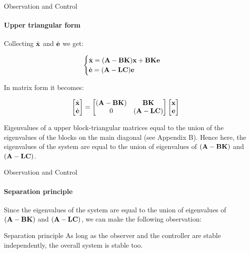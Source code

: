 \documentclass{beamer}
\begin{document}
\begin{frame}{Observation and Control}
\framesubtitle{Upper triangular form}
\begin{flushleft}

Collecting $\dot {\mathbf{x}}$ and $\dot{\mathbf{e}}$ we get:

\begin{equation}
\begin{cases}
\dot {\mathbf{x}} = (\mathbf{A}-\mathbf{B}\mathbf{K}) \mathbf{x} +  \mathbf{B}\mathbf{K}\mathbf{e} \\
\dot{\mathbf{e}} = 
(\mathbf{A}  - \mathbf{L}\mathbf{C})\mathbf{e}
\end{cases}
\end{equation}

In matrix form it becomes:

\begin{equation}
\begin{bmatrix}
\dot {\mathbf{x}} \\
\dot{\mathbf{e}}
\end{bmatrix}
=
\begin{bmatrix}
(\mathbf{A}-\mathbf{B}\mathbf{K}) & \mathbf{B}\mathbf{K} \\
0 & (\mathbf{A}  - \mathbf{L}\mathbf{C})
\end{bmatrix}
\begin{bmatrix}
\mathbf{x} \\
\mathbf{e}
\end{bmatrix}
\end{equation}

Eigenvalues of a upper block-triangular matrices equal to the union of the eigenvalues of the blocks on the main diagonal (see Appendix B). Hence here, the eigenvalues of the system are equal to the union of eigenvalues of $(\mathbf{A}-\mathbf{B}\mathbf{K})$ and $(\mathbf{A}  - \mathbf{L}\mathbf{C})$. 

\end{flushleft}
\end{frame}



\begin{frame}{Observation and Control}
\framesubtitle{Separation principle}
\begin{flushleft}
 
Since the eigenvalues of the system are equal to the union of eigenvalues of $(\mathbf{A}-\mathbf{B}\mathbf{K})$ and $(\mathbf{A}  - \mathbf{L}\mathbf{C})$, we can make the following observation:

\bigskip

\begin{alertblock}{Separation principle}
As long as the observer and the controller are stable independently, the overall system is stable too.
\end{alertblock}

\end{flushleft}
\end{frame}
\end{document}
